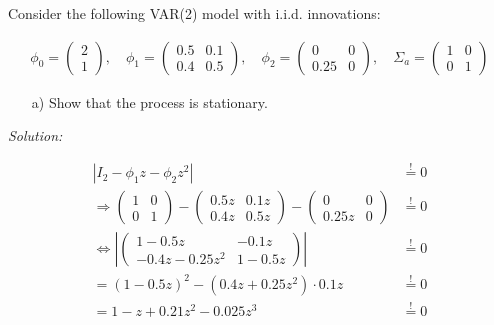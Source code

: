 \documentclass[12pt,a4paper]{article}
\begin{document}
Consider the following VAR(2) model with i.i.d. innovations:

\begin{align*}
    \phi_0 = \begin{pmatrix} 2 \\ 1 \end{pmatrix}, \quad \phi_1 = \begin{pmatrix} 0.5 & 0.1 \\ 0.4 & 0.5 \end{pmatrix}, \quad \phi_2 = \begin{pmatrix} 0 & 0 \\ 0.25 & 0 \end{pmatrix}, \quad \Sigma_a = \begin{pmatrix} 1 & 0 \\ 0 & 1 \end{pmatrix}
\end{align*}

\begin{itemize}
    \item[a)] Show that the process is stationary.
\end{itemize}

\emph{Solution:}

\begin{align*}
  \left| I_2 - \phi_1 z - \phi_2 z^2 \right| & \overset{!}{=} 0 \\
  \Rightarrow \begin{pmatrix} 1 & 0 \\ 
  0 & 1 \end{pmatrix} - \begin{pmatrix}  0.5 z & 0.1 z \\
  0.4 z & 0.5 z
  \end{pmatrix} - 
  \begin{pmatrix}  0 & 0 \\
  0.25 z & 0
  \end{pmatrix} & \overset{!}{=} 0\\
  \Leftrightarrow
  \left|
    \begin{pmatrix}  1- 0.5 z & -0.1 z \\
      -0.4 z - 0.25z^2 & 1- 0.5z
  \end{pmatrix}
  \right| & \overset{!}{=} 0\\
  = (1 - 0.5 z)^2 - (0.4z + 0.25z^2) \cdot 0.1z  & \overset{!}{=} 0 \\
  = 1 - z + 0.21 z^2 -0.025 z^3 & \overset{!}{=} 0
\end{align*}
\end{document}

